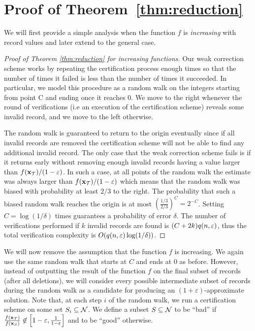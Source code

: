 \section{Proof of Theorem~\ref{thm:reduction}}\label{app:weak}

We will first provide a simple analysis when the function $f$ is \emph{increasing} with record values and later extend to the general case.

\begin{proof}[Proof of Theorem \ref{thm:reduction} for increasing functions]
  Our weak correction scheme works by repeating the certification process enough times so that the number of times it failed is less than the number of
times it succeeded. In particular, we model this procedure as a random walk on the integers starting from point C and ending once it reaches 0. We move
to the right whenever the round of verifications (i.e an execution of the certification scheme) reveals some invalid record, and we move to the left
otherwise.

  The random walk is guaranteed to return to the origin eventually since if all invalid records are removed the certification scheme will not be able to
find any additional invalid record. The only case that the weak correction scheme fails is if it returns early without removing enough invalid records
having a value larger than $f(\mathbf{x}_{\mathcal{T}})/(1-\varepsilon)$. In such a case, at all points of the random walk the estimate was always larger than $f(\mathbf{x}_{\mathcal{T}})/(1-\varepsilon)$ which
means that the random walk was biased with probability at least $2/3$ to the right. The probability that such a biased random walk reaches the origin is
at most $\left( \frac {1/3} {2/3} \right)^C = 2^{-C}$. Setting $C = \log(1/\delta)$ times guarantees a probability of error $\delta$.
The number of verifications performed if $k$ invalid records are found is $(C + 2 k) q(n,\varepsilon)$, thus the total verification complexity is
$O(q(n,\varepsilon) \log(1/\delta))$.
\end{proof}

We will now remove the assumption that the function $f$ is increasing.
We again use the same random walk that starts at $C$ and ends at 0 as before. However, instead of outputting the result of the function $f$ on the final subset of records (after all deletions), we will consider every possible intermediate subset of records during the random walk as a candidate for producing an $(1+\varepsilon)$-approximate solution. Note that, at each step $i$ of the random walk, we run a certification scheme on some set $S_i\subseteq \mathcal{N}$. We define a subset $S\subseteq\mathcal{N}$ to be ``bad'' if $\frac{f(\mathbf{x}_{\mathcal{T}})}{f(\mathbf{x}_S)} \not\in \left[ 1 - \varepsilon, \frac{1}{1 - \varepsilon} \right]$ and to be ``good'' otherwise.

